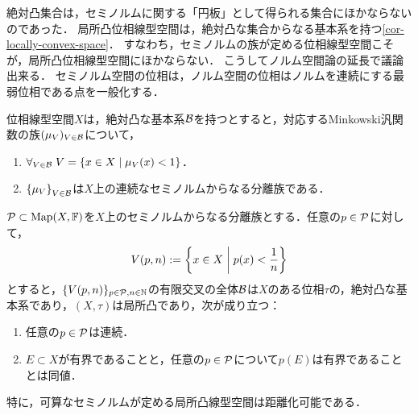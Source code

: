 \documentclass[uplatex,dvipdfmx]{jsreport}
\begin{document}
\begin{tcolorbox}[colframe=ForestGreen, colback=ForestGreen!10!white,breakable,colbacktitle=ForestGreen!40!white,coltitle=black,fonttitle=\bfseries\sffamily,
title=]
    絶対凸集合は，セミノルムに関する「円板」として得られる集合にほかならないのであった．
    局所凸位相線型空間は，絶対凸な集合からなる基本系を持つ\ref{cor-locally-convex-space}．
    すなわち，セミノルムの族が定める位相線型空間こそが，局所凸位相線型空間にほかならない．
    こうしてノルム空間論の延長で議論出来る．
    セミノルム空間の位相は，ノルム空間の位相はノルムを連続にする最弱位相である点を一般化する．
\end{tcolorbox}

\begin{theorem}
    位相線型空間$X$は，絶対凸な基本系$\B$を持つとすると，対応するMinkowski汎関数の族$(\mu_V)_{V\in\B}$について，
    \begin{enumerate}
        \item $\forall_{V\in\B}\;V=\Brace{x\in X\mid\mu_V(x)<1}$．
        \item $\Brace{\mu_V}_{V\in\B}$は$X$上の連続なセミノルムからなる分離族である．
    \end{enumerate}
\end{theorem}

\begin{theorem}
    $\P\subset\Map(X,\bF)$を$X$上のセミノルムからなる分離族とする．任意の$p\in\P$に対して，
    \[V(p,n):=\Brace{x\in X\;\middle|\;p(x)<\frac{1}{n}}\]
    とすると，$\{V(p,n)\}_{p\in\P,n\in\N}$の有限交叉の全体$\B$は$X$のある位相$\tau$の，絶対凸な基本系であり，$(X,\tau)$は局所凸であり，次が成り立つ：
    \begin{enumerate}
        \item 任意の$p\in\P$は連続．
        \item $E\subset X$が有界であることと，任意の$p\in\P$について$p(E)$は有界であることとは同値．
    \end{enumerate}
\end{theorem}
\begin{remarks}
    特に，可算なセミノルムが定める局所凸線型空間は距離化可能である．
\end{remarks}
\end{document}
